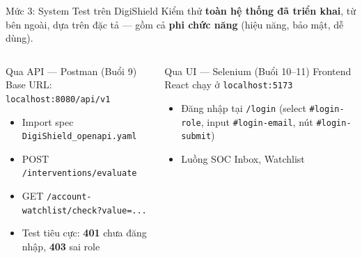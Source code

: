 \documentclass[aspectratio=169,12pt]{beamer}
\begin{document}
\begin{frame}[fragile]{Mức 3: System Test trên DigiShield}
  \small Kiểm thử \textbf{toàn hệ thống đã triển khai}, từ bên ngoài, dựa trên đặc tả ---
  gồm cả \textbf{phi chức năng} (hiệu năng, bảo mật, dễ dùng).

  \vspace{0em}
  \begin{columns}[T]
    \begin{block}{Qua API --- Postman (Buổi 9)\vphantom{ỹể}}
      \small Base URL: \texttt{localhost:8080/api/v1}
      \begin{itemize}
        \item Import spec \texttt{DigiShield\_openapi.yaml}
        \item POST \texttt{/interventions/evaluate}
        \item GET \texttt{/account-watchlist/}\allowbreak\texttt{check?value=...}
        \item Test tiêu cực: \textbf{401} chưa đăng nhập, \textbf{403} sai role
      \end{itemize}
    \end{block}
    \begin{block}{Qua UI --- Selenium (Buổi 10--11)\vphantom{ỹể}}
      \small Frontend React chạy ở \texttt{localhost:5173}
      \begin{itemize}
        \item Đăng nhập tại \texttt{/login} (select \texttt{\#login-role},
              input \texttt{\#login-email}, nút \texttt{\#login-submit})
        \item Luồng SOC Inbox, Watchlist
      \end{itemize}
    \end{block}
  \end{columns}
\end{frame}
\end{document}
